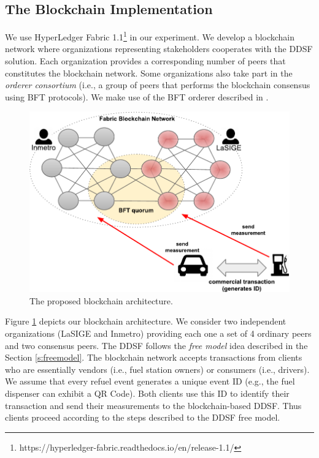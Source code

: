 \documentclass[sigplan]{acmart}
\begin{document}
\subsection{The Blockchain Implementation}
We use HyperLedger Fabric 1.1\footnote{https://hyperledger-fabric.readthedocs.io/en/release-1.1/} in our experiment.
We develop a blockchain network where organizations representing stakeholders cooperates with the DDSF solution.
Each organization provides a corresponding number of peers that constitutes the blockchain network.
Some organizations also take part in the \textit{orderer consortium} (i.e., a group of peers that performs the blockchain consensus using BFT protocols).
We make use of the BFT orderer described in \cite{Sousa2018}.

\begin{figure}[!t]
\centering
\includegraphics[width=.4\textwidth]{fbn}
\caption{The proposed blockchain architecture.}
\label{f:fbn}
\end{figure}

Figure \ref{f:fbn} depicts our blockchain architecture. 
We consider two independent organizations (LaSIGE and Inmetro) providing each one a set of 4 ordinary peers and two consensus peers.
The DDSF follows the \emph{free model} idea described in the Section \ref{s:freemodel}.
The blockchain network accepts transactions from clients who are essentially vendors (i.e., fuel station owners) or consumers (i.e., drivers).
We assume that every refuel event generates a unique event ID (e.g., the fuel dispenser can exhibit a QR Code).
Both clients use this ID to identify their transaction and send their measurements to the blockchain-based DDSF.
Thus clients proceed according to the steps described to the DDSF free model.
\end{document}
